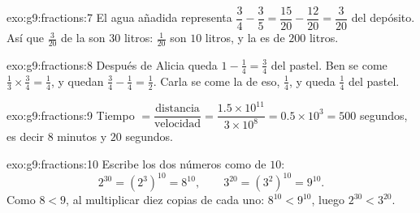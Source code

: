 \begin{solution}{exo:g9:fractions:7}
El agua añadida representa
$\dfrac34 - \dfrac35 = \dfrac{15}{20} - \dfrac{12}{20} = \dfrac{3}{20}$
del depósito. Así que $\frac{3}{20}$ de la  son $30$ litros:
$\frac{1}{20}$ son $10$ litros, y la  es de $200$ litros.
\end{solution}

\begin{solution}{exo:g9:fractions:8}
Después de Alicia queda $1 - \frac14 = \frac34$ del pastel. Ben se come
$\frac13 \times \frac34 = \frac14$, y quedan
$\frac34 - \frac14 = \frac12$. Carla se come la  de eso, $\frac14$,
y queda $\frac14$ del pastel.
\end{solution}

\begin{solution}{exo:g9:fractions:9}
Tiempo $= \dfrac{\text{distancia}}{\text{velocidad}} =
\dfrac{1.5 \times 10^{11}}{3 \times 10^8} = 0.5 \times 10^3 = 500$
segundos, es decir $8$ minutos y $20$ segundos.
\end{solution}

\begin{solution}{exo:g9:fractions:10}
Escribe los dos números como  de  $10$:
\[
2^{30} = \left(2^3\right)^{10} = 8^{10},
\qquad
3^{20} = \left(3^2\right)^{10} = 9^{10}.
\]
Como $8 < 9$, al multiplicar diez copias de cada uno: $8^{10} < 9^{10}$, luego
$2^{30} < 3^{20}$.
\end{solution}

